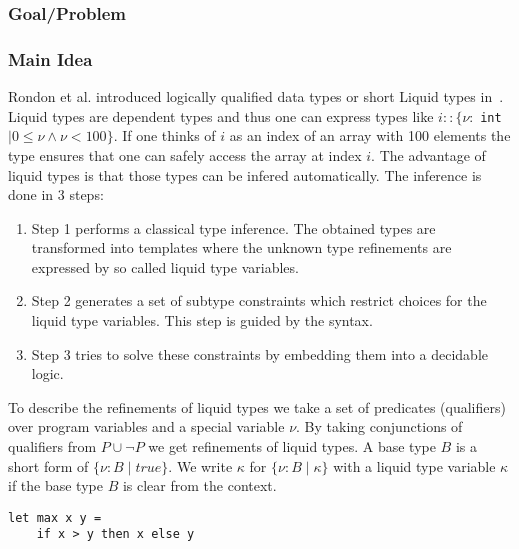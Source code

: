\documentclass[a4paper,UKenglish]{lipics-v2016}
\begin{document}
\subsubsection{Goal/Problem}

\subsubsection{Main Idea}

Rondon et al. introduced logically qualified data types or short Liquid types in~\cite{Rondon:2008:LT}.
Liquid types are dependent types and thus one can express types like $i:: \{\nu:$ \lstinline{int} $\mid 0 \le \nu \land \nu < 100\}$.
If one thinks of $i$ as an index of an array with 100 elements the type ensures that one can safely access the array at index $i$.
The advantage of liquid types is that those types can be infered automatically.
The inference is done in 3 steps:
\begin{enumerate}
    \item Step 1 performs a classical type inference.
        The obtained types are transformed into templates where the unknown type refinements are expressed by so called liquid type variables.
    \item Step 2 generates a set of subtype constraints which restrict choices for the liquid type variables.
        This step is guided by the syntax.
    \item Step 3 tries to solve these constraints by embedding them into a decidable logic.
\end{enumerate}

To describe the refinements of liquid types we take a set of predicates (qualifiers) over program variables and a special variable $\nu$.
By taking conjunctions of qualifiers from $P \cup \neg P$ we get refinements of liquid types.
A base type $B$ is a short form of $\{\nu: B \mid true\}$.
We write $\kappa$ for $\{\nu: B \mid \kappa\}$ with a liquid type variable $\kappa$ if the base type $B$ is clear from the context.

\begin{lstlisting}[caption={Example Program},label=lst:exmpl,captionpos=t,float,abovecaptionskip=-\medskipamount]
let max x y =
    if x > y then x else y
\end{lstlisting}
\end{document}
